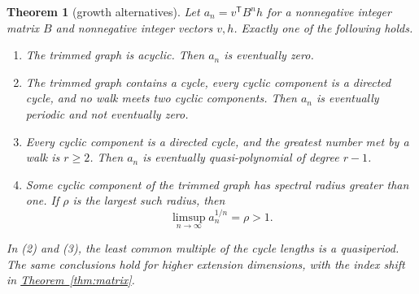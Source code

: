 \documentclass[reqno]{amsart}
\numberwithin{equation}{section}
\newtheorem{theorem}{Theorem}[section]
\theoremstyle{definition}
\theoremstyle{remark}
\newcommand{\transpose}{^{\mathsf T}}
\newcommand{\thmref}[1]{\hyperref[#1]{Theorem~\ref*{#1}}}
\begin{document}
\begin{theorem}[growth alternatives]\label{thm:growth}
Let \(a_n=v\transpose B^nh\) for a nonnegative integer matrix \(B\) and nonnegative integer vectors \(v,h\). Exactly one of the following holds.
\begin{enumerate}
\item The trimmed graph is acyclic. Then \(a_n\) is eventually zero.
\item The trimmed graph contains a cycle, every cyclic component is a directed cycle, and no walk meets two cyclic components. Then \(a_n\) is eventually periodic and not eventually zero.
\item Every cyclic component is a directed cycle, and the greatest number met by a walk is \(r\ge2\). Then \(a_n\) is eventually quasi-polynomial of degree \(r-1\).
\item Some cyclic component of the trimmed graph has spectral radius greater than one. If \(\rho\) is the largest such radius, then
\[
\limsup_{n\to\infty}a_n^{1/n}=\rho>1.
\]
\end{enumerate}
In \textup{(2)} and \textup{(3)}, the least common multiple of the cycle lengths is a quasiperiod. The same conclusions hold for higher extension dimensions, with the index shift in \thmref{thm:matrix}.
\end{theorem}
\end{document}
